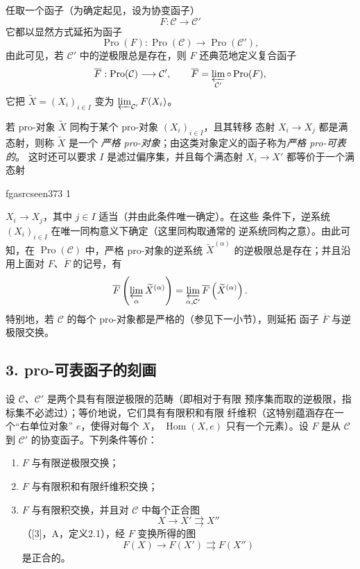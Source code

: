 \documentclass[12pt,twoside,openany]{book}
\numberwithin{equation}{section}
\newcommand{\fgaunitid}{unbound}
\newcommand{\src}[1]{%
  \phantomsection
  \hypertarget{src:\fgaunitid:#1}{}%
  \hypertarget{fga.\fgaunitid.p#1}{}%
  \ifcsname fgasrcseen#1\endcsname\else
    \expandafter\gdef\csname fgasrcseen#1\endcsname{1}%
    \hypertarget{src:#1}{}%
  \fi
  \marginpar{\raggedleft\footnotesize\sffamily #1}%
}
\newcommand{\fquote}[1]{“#1”}
\theoremstyle{plain}
\theoremstyle{definition}
\theoremstyle{remark}
\begin{document}
任取一个函子（为确定起见，设为协变函子）
\[
  F:\mathcal C\longrightarrow\mathcal C'
\]
它都以显然方式延拓为函子
\[
  \operatorname{Pro}(F):\operatorname{Pro}(\mathcal C)
  \longrightarrow\operatorname{Pro}(\mathcal C'),
\]
由此可见，若 $\mathcal C'$ 中的逆极限总是存在，则 $F$ 还典范地定义复合函子
\[
  \overline F:\operatorname{Pro}(\mathcal C)\longrightarrow\mathcal C',
  \qquad
  \overline F=\varprojlim_{\mathcal C'}\circ\operatorname{Pro}(F),
\]
它把 $\widetilde X=(X_i)_{i\in I}$ 变为
$\varprojlim_{\mathcal C'}F(X_i)$。

若 pro-对象 $\widetilde X$ 同构于某个 pro-对象 $(X_i)_{i\in I}$，且其转移
态射 $X_i\longrightarrow X_j$ 都是满态射，则称 $\widetilde X$ 是一个
\emph{严格 pro-对象}；由这类对象定义的函子称为\emph{严格 pro-可表的}。
这时还可以要求 $I$ 是滤过偏序集，并且每个满态射
$X_i\longrightarrow X'$ 都等价于一个满态射

\src{373}
$X_i\longrightarrow X_j$，其中 $j\in I$ 适当（并由此条件唯一确定）。在这些
条件下，逆系统 $(X_i)_{i\in I}$ 在唯一同构意义下确定（这里同构取通常的
逆系统同构之意）。由此可知，在 $\operatorname{Pro}(\mathcal C)$ 中，严格
pro-对象的逆系统 $\widetilde X^{(\alpha)}$ 的逆极限总是存在；并且沿用上面对
$F$、$\overline F$ 的记号，有
\[
  \overline F\left(\varprojlim_\alpha\widetilde X^{(\alpha)}\right)
  =\varprojlim_{\alpha,\mathcal C'}
  \overline F\left(\widetilde X^{(\alpha)}\right).
\]
特别地，若 $\mathcal C$ 的每个 pro-对象都是严格的（参见下一小节），则延拓
函子 $\overline F$ 与逆极限交换。

\subsection*{3. pro-可表函子的刻画}

设 $\mathcal C$、$\mathcal C'$ 是两个具有有限逆极限的范畴（即相对于有限
预序集而取的逆极限，指标集不必滤过）；等价地说，它们具有有限积和有限
纤维积（这特别蕴涵存在一个\fquote{右单位对象} $e$，使得对每个 $X$，
$\operatorname{Hom}(X,e)$ 只有一个元素）。设 $F$ 是从 $\mathcal C$ 到
$\mathcal C'$ 的协变函子。下列条件等价：

\begin{enumerate}
\item[(i)] $F$ 与有限逆极限交换；
\item[(ii)] $F$ 与有限积和有限纤维积交换；
\item[(iii)] $F$ 与有限积交换，并且对 $\mathcal C$ 中每个正合图
\[
  X\longrightarrow X'\rightrightarrows X''
\]
（[3]，A，定义2.1），经 $F$ 变换所得的图
\[
  F(X)\longrightarrow F(X')\rightrightarrows F(X'')
\]
是正合的。
\end{enumerate}
\end{document}
